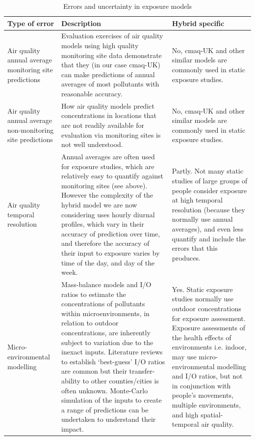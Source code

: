 \thispagestyle{empty}
\begin{landscape}

\begin{table}[ht]
\caption{Errors and uncertainty in exposure models}
\begin{tabular}{ | p{3.9cm} | p{13.0cm} | p{7.4cm} |}
\hline
\textbf{Type of error} & \textbf{Description} & \textbf{Hybrid specific} \\ \hline
        Air quality annual average monitoring site predictions  &  Evaluation exercises of air quality models using high quality monitoring site data demonstrate that they (in our case \gls{cmaq}-UK) can make predictions of annual averages of most pollutants with reasonable accuracy.         &  No, \gls{cmaq}-UK and other similar models are commonly used in static exposure studies.         \\ \hline
        
        Air quality annual average non-monitoring site predictions  &  How air quality models predict concentrations in locations that are not readily available for evaluation via monitoring sites is not well understood.         &   No, \gls{cmaq}-UK and other similar models are commonly used in static exposure studies.        \\ \hline
        
        Air quality temporal resolution  &  Annual averages are often used for exposure studies, which are relatively easy to quantify against monitoring sites (see above). However the complexity of the hybrid model we are now considering uses hourly diurnal profiles, which vary in their accuracy of prediction over time, and therefore the accuracy of their input to exposure varies by time of the day, and day of the week.         &   Partly. Not many static studies of large groups of people consider exposure at high temporal resolution (because they normally use annual averages), and even less quantify and include the errors that this produces.        \\ \hline
        
        Micro-environmental modelling  &   Mass-balance models and I/O ratios to estimate the concentrations of pollutants within microenvironments, in relation to outdoor concentrations, are inherently subject to variation due to the inexact inputs. Literature reviews to establish ‘best-guess’ I/O ratios are common but their transfer-ability to other counties/cities is often unknown. Monte-Carlo simulation of the inputs to create a range of predictions can be undertaken to understand their impact.         &    Yes. Static exposure studies normally use outdoor concentrations for exposure assessment. Exposure assessments of the health effects of environments i.e. indoor, may use micro-environmental modelling and I/O ratios, but not in conjunction with people’s movements, multiple environments, and high spatial-temporal air quality.       \\ \hline
        

\end{tabular}
\end{table}
\end{landscape}
